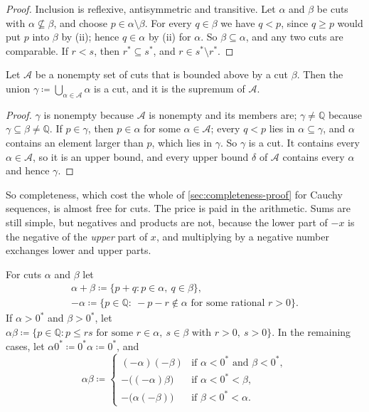\begin{proof}
Inclusion is reflexive, antisymmetric and transitive. Let $\alpha$ and $\beta$ be cuts with $\alpha\not\subseteq\beta$, and choose $p\in\alpha\setminus\beta$. For every $q\in\beta$ we have $q<p$, since $q\ge p$ would put $p$ into $\beta$ by (ii); hence $q\in\alpha$ by (ii) for $\alpha$. So $\beta\subseteq\alpha$, and any two cuts are comparable. If $r<s$, then $r^*\subseteq s^*$, and $r\in s^*\setminus r^*$.
\end{proof}

\begin{theorem}
\label{thm:cut-sup}
Let $\mathcal A$ be a nonempty set of cuts that is bounded above by a cut $\beta$. Then the union $\gamma\coloneqq\bigcup_{\alpha\in\mathcal A}\alpha$ is a cut, and it is the supremum of $\mathcal A$.
\end{theorem}

\begin{proof}
$\gamma$ is nonempty because $\mathcal A$ is nonempty and its members are; $\gamma\ne\mathbb Q$ because $\gamma\subseteq\beta\ne\mathbb Q$. If $p\in\gamma$, then $p\in\alpha$ for some $\alpha\in\mathcal A$; every $q<p$ lies in $\alpha\subseteq\gamma$, and $\alpha$ contains an element larger than $p$, which lies in $\gamma$. So $\gamma$ is a cut. It contains every $\alpha\in\mathcal A$, so it is an upper bound, and every upper bound $\delta$ of $\mathcal A$ contains every $\alpha$ and hence $\gamma$.
\end{proof}

So completeness, which cost the whole of \cref{sec:completeness-proof} for Cauchy sequences, is almost free for cuts. The price is paid in the arithmetic. Sums are still simple, but negatives and products are not, because the lower part of $-x$ is the negative of the \emph{upper} part of $x$, and multiplying by a negative number exchanges lower and upper parts.

\begin{definition}
\label{def:cut-arithmetic}
For cuts $\alpha$ and $\beta$ let
\begin{gather*}
\alpha+\beta\coloneqq\{p+q: p\in\alpha,\ q\in\beta\},\\
-\alpha\coloneqq\{p\in\mathbb Q:\ -p-r\notin\alpha\text{ for some rational }r>0\}.
\end{gather*}
If $\alpha>0^*$ and $\beta>0^*$, let $\alpha\beta\coloneqq\{p\in\mathbb Q: p\le rs\text{ for some }r\in\alpha,\ s\in\beta\text{ with }r>0,\ s>0\}$. In the remaining cases, let $\alpha0^*\coloneqq0^*\alpha\coloneqq0^*$, and
\[
\alpha\beta\coloneqq\begin{cases}(-\alpha)(-\beta)&\text{if }\alpha<0^*\text{ and }\beta<0^*,\\ -\bigl((-\alpha)\beta\bigr)&\text{if }\alpha<0^*<\beta,\\ -\bigl(\alpha(-\beta)\bigr)&\text{if }\beta<0^*<\alpha.\end{cases}
\]
\end{definition}

